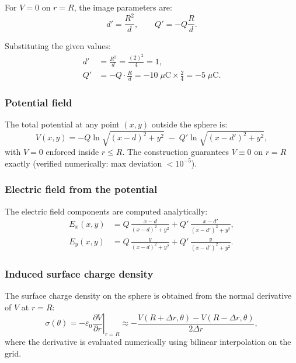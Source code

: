 \documentclass[11pt,a4paper]{article}
\begin{document}
For $V=0$ on $r=R$, the image parameters are:
\begin{equation}
\boxed{\;d' = \frac{R^2}{d}, \qquad Q' = -Q\frac{R}{d}.\;}
\label{eq:image}
\end{equation}

Substituting the given values:
\begin{align}
d' &= \frac{R^2}{d} = \frac{(2)^2}{4} = 1, \\[4pt]
Q' &= -Q \cdot \frac{R}{d} = -10\;\mu\text{C} \times \frac{2}{4} = -5\;\mu\text{C}.
\end{align}

\subsubsection{Potential field}

The total potential at any point $(x,y)$ outside the sphere is:
\begin{equation}
V(x,y) = -Q \ln\sqrt{(x-d)^2 + y^2} \;-\; Q' \ln\sqrt{(x-d')^2 + y^2},
\end{equation}
with $V=0$ enforced inside $r \le R$. The construction guarantees $V \equiv 0$ on $r=R$ exactly (verified numerically: max deviation $< 10^{-5}$).

\subsubsection{Electric field from the potential}

The electric field components are computed analytically:
\begin{align}
E_x(x,y) &= Q\,\frac{x-d}{(x-d)^2 + y^2} + Q'\,\frac{x-d'}{(x-d')^2 + y^2}, \\[4pt]
E_y(x,y) &= Q\,\frac{y}{(x-d)^2 + y^2} + Q'\,\frac{y}{(x-d')^2 + y^2}.
\end{align}

\subsubsection{Induced surface charge density}

The surface charge density on the sphere is obtained from the normal derivative of $V$ at $r=R$:
\begin{equation}
\sigma(\theta) = -\varepsilon_0 \left.\frac{\partial V}{\partial r}\right|_{r=R} \approx -\frac{V(R+\Delta r,\theta) - V(R-\Delta r,\theta)}{2\Delta r},
\label{eq:sigma}
\end{equation}
where the derivative is evaluated numerically using bilinear interpolation on the grid.
\end{document}
